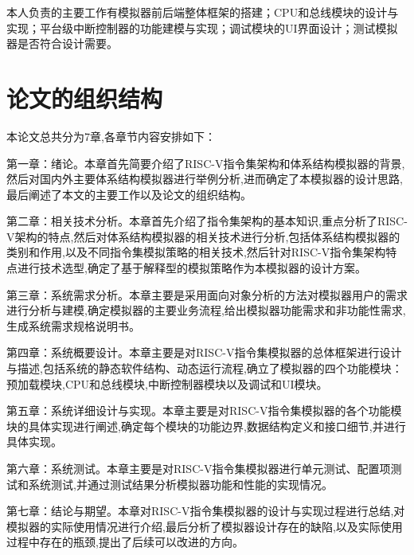 本人负责的主要工作有模拟器前后端整体框架的搭建；CPU和总线模块的设计与实现；平台级中断控制器的功能建模与实现；调试模块的UI界面设计；测试模拟器是否符合设计需要。


\section{论文的组织结构}
本论文总共分为7章,各章节内容安排如下：


第一章：绪论。本章首先简要介绍了RISC-V指令集架构和体系结构模拟器的背景,然后对国内外主要体系结构模拟器进行举例分析,进而确定了本模拟器的设计思路,最后阐述了本文的主要工作以及论文的组织结构。


第二章：相关技术分析。本章首先介绍了指令集架构的基本知识,重点分析了RISC-V架构的特点,然后对体系结构模拟器的相关技术进行分析,包括体系结构模拟器的类别和作用,以及不同指令集模拟策略的相关技术,然后针对RISC-V指令集架构特点进行技术选型,确定了基于解释型的模拟策略作为本模拟器的设计方案。


第三章：系统需求分析。本章主要是采用面向对象分析的方法对模拟器用户的需求进行分析与建模,确定模拟器的主要业务流程,给出模拟器功能需求和非功能性需求,生成系统需求规格说明书。


第四章：系统概要设计。本章主要是对RISC-V指令集模拟器的总体框架进行设计与描述,包括系统的静态软件结构、动态运行流程,确立了模拟器的四个功能模块：预加载模块,CPU和总线模块,中断控制器模块以及调试和UI模块。


第五章：系统详细设计与实现。本章主要是对RISC-V指令集模拟器的各个功能模块的具体实现进行阐述,确定每个模块的功能边界,数据结构定义和接口细节,并进行具体实现。


第六章：系统测试。本章主要是对RISC-V指令集模拟器进行单元测试、配置项测试和系统测试,并通过测试结果分析模拟器功能和性能的实现情况。


第七章：结论与期望。本章对RISC-V指令集模拟器的设计与实现过程进行总结,对模拟器的实际使用情况进行介绍,最后分析了模拟器设计存在的缺陷,以及实际使用过程中存在的瓶颈,提出了后续可以改进的方向。


